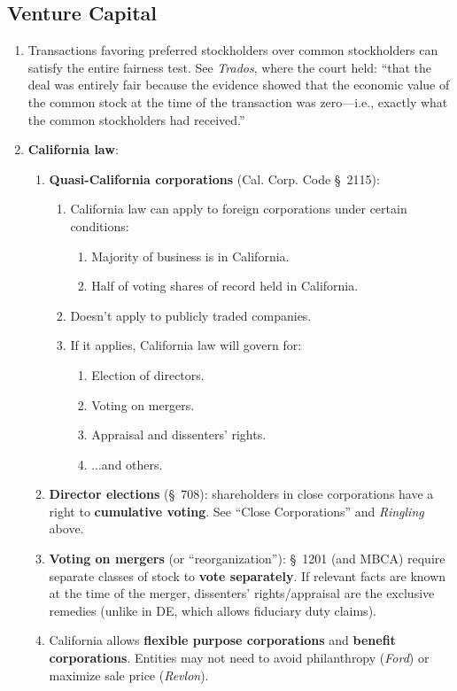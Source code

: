 \newpage

\subsection{Venture Capital}

\begin{enumerate}
    \item Transactions favoring preferred stockholders over common 
    stockholders can satisfy the entire fairness test. See \emph{Trados}, 
    where the court held: ``that the deal was entirely fair because the 
    evidence showed that the economic value of the common stock at the time of 
    the transaction was zero---i.e., exactly what the common stockholders had 
    received.''
    \item \textbf{California law}:
    \begin{enumerate}
        \item \textbf{Quasi-California corporations} (Cal. Corp. Code \S\ 
        2115):
        \begin{enumerate}
            \item California law can apply to foreign corporations under 
            certain conditions:
            \begin{enumerate}
                \item Majority of business is in California.
                \item Half of voting shares of record held in California.
            \end{enumerate}
            \item Doesn't apply to publicly traded companies.
            \item If it applies, California law will govern for:
            \begin{enumerate}
                \item Election of directors.
                \item Voting on mergers.
                \item Appraisal and dissenters' rights.
                \item ...and others.
            \end{enumerate}
        \end{enumerate}
        \item \textbf{Director elections} (\S\ 708): shareholders in close 
        corporations have a right to \textbf{cumulative voting}. See ``Close 
        Corporations'' and \emph{Ringling} above.
        \item \textbf{Voting on mergers} (or ``reorganization''): \S\ 1201 
        (and MBCA) require separate classes of stock to \textbf{vote 
        separately}. If relevant facts are known at the time of the merger, 
        dissenters' rights/appraisal are the exclusive remedies (unlike in DE, 
        which allows fiduciary duty claims).
        \item California allows \textbf{flexible purpose corporations} and 
        \textbf{benefit corporations}. Entities may not need to avoid 
        philanthropy (\emph{Ford}) or maximize sale price (\emph{Revlon}).
    \end{enumerate}
\end{enumerate}

